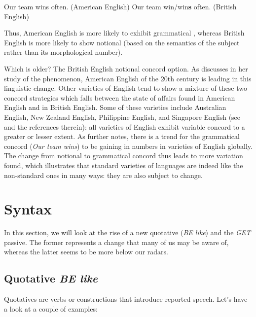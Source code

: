 \begin{exe}
    \ex 
    Our team wins often. \hfill (American English)
    \ex 
    Our team win/win\textbf{s} often. \hfill (British English)
\end{exe}

\noindent Thus, American English is more likely to exhibit grammatical , whereas British English is more likely to show notional  (based on the semantics of the subject rather than its morphological number).

Which is older? The British English notional concord option. As \citet{Hundt2003} discusses in her study of the phenomenon, American English of the 20th century is leading in this linguistic change. Other varieties of English tend to show a mixture of these two concord strategies which falls between the state of affairs found in American English and in British English. Some of these varieties include Australian English, New Zealand English, Philippine English, and Singapore English (see \citealp{Hundt2003} and the references therein): all varieties of English exhibit variable concord to a greater or lesser extent. As \citet[207]{Hundt2003} further notes, there is a trend for the grammatical concord (\emph{Our team wins}) to be gaining in numbers in varieties of English globally. The change from notional to grammatical concord thus leads to more variation found, which illustrates that standard varieties of languages are indeed like the non-standard ones in many ways: they are also subject to change.

\section{Syntax}
In this section, we will look at the rise of a new quotative (\emph{BE like}) and the \emph{GET} passive. The former represents a change that many of us may be aware of, whereas the latter seems to be more below our radars.

\subsection{Quotative \emph{BE like}}\label{be-like}
Quotatives are verbs or constructions that introduce reported speech. Let's have a look at a couple of examples:

